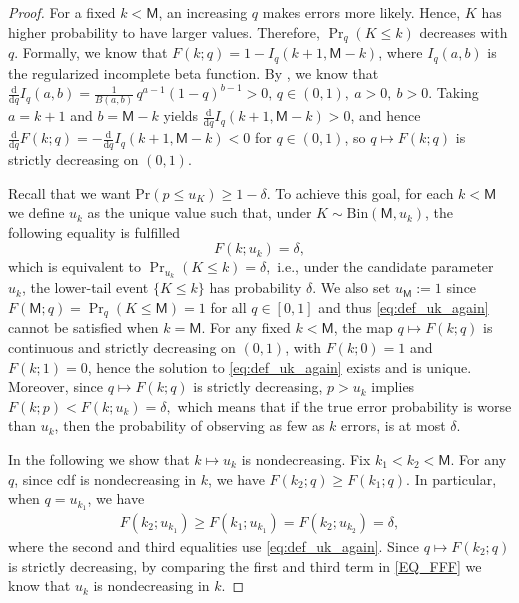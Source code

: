 \documentclass[onecolumn]{IEEEtran} %
\newcommand{\1}{\mathbbm{1}}
\theoremstyle{boldremark}
\begin{document}
\begin{proof}
For a fixed $k<\textsf{M}$, an increasing $q$ makes errors more likely. Hence, $K$ has higher probability to have larger values. Therefore, $\Pr_q(K\le k)$ decreases with $q$.
Formally, we know that $F(k;q)=1-I_q(k+1,\textsf{M}-k)$, where $I_q(a,b)$ is the regularized incomplete
beta function. By \cite[(8.17.18)]{NIST:DLMF},
we know that ${\frac{\mathrm{d}}{\mathrm{d}q} I_q(a,b)
=\frac{1}{B(a,b)}\,q^{a-1}(1-q)^{b-1}>0},\,q\in(0,1),\ a>0,\ b>0.$
Taking $a=k+1$ and $b=\textsf{M}-k$ yields $\frac{\mathrm{d}}{\mathrm{d}q}I_q(k+1,\textsf{M}-k)>0$, and hence
$\frac{\mathrm{d}}{\mathrm{d}q}F(k;q)=-\frac{\mathrm{d}}{\mathrm{d}q}I_q(k+1,\textsf{M}-k)<0$ for $q\in(0,1)$,
so $q\mapsto F(k;q)$ is strictly decreasing on $(0,1)$.

Recall that we want Pr$(p\leq u_K)\geq 1-\delta$. To achieve this goal, for each $k<\textsf{M}$ we define $u_k$ as the unique value such that, under
$K\sim\mathrm{Bin}(\textsf{M},u_k)$, the following equality is fulfilled
\begin{equation}\label{eq:def_uk_again}
F(k;u_k)=\delta,
\end{equation}
which is equivalent to $\Pr_{u_k}(K\le k)=\delta,$
i.e., under the candidate parameter $u_k$, the lower-tail event $\{K\le k\}$ has probability $\delta$.
We also set $u_{\textsf{M}}:=1$ since $F(\textsf{M};q)=\Pr_q(K\le \textsf{M})=1$ for all $q\in[0,1]$ and thus
\eqref{eq:def_uk_again} cannot be satisfied when $k=\textsf{M}$.
For any fixed $k<\textsf{M}$, the map $q\mapsto F(k;q)$ is continuous and strictly decreasing on $(0,1)$, with
$F(k;0)=1$ and $F(k;1)=0$, hence the solution to \eqref{eq:def_uk_again} exists and is unique.
Moreover, since $q\mapsto F(k;q)$ is strictly decreasing, $p>u_k$ implies
$F(k;p)<F(k;u_k)=\delta,$ which means that if the true error probability is worse than $u_k$, then the probability of observing as few as $k$ errors, is at most $\delta$.

In the following we show that $k\mapsto u_k$ is nondecreasing. Fix $k_1<k_2<\textsf{M}$.
For any $q$, since \gls{cdf} is nondecreasing in $k$, we have $F(k_2;q)\ge F(k_1;q)$.
In particular, when $q=u_{k_1}$, we have
\begin{align}\label{EQ_FFF}
    F(k_2;u_{k_1})\ge F(k_1;u_{k_1})=F(k_2;u_{k_2})=\delta,    
\end{align}
where the second and third equalities use \eqref{eq:def_uk_again}.
Since $q\mapsto F(k_2;q)$ is strictly decreasing, by comparing the first and third term in \eqref{EQ_FFF} we know that $u_k$ is nondecreasing in $k$.



\end{proof}
\end{document}
